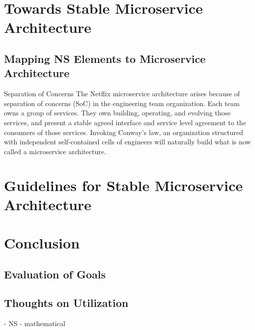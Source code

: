 \documentclass[thesis=M,english,hidelinks]{FITthesis}[2012/10/20]
\begin{document}
% 
% 

\chapter{Towards Stable Microservice Architecture}
\label{sec:msa_compliance}
\section{Mapping NS Elements to Microservice Architecture}


Separation of Concerns
The Netflix microservice architecture arises because of separation of concerns (SoC) in the engineering team organization. Each team owns a group of services. They own building, operating, and evolving those services, and present a stable agreed interface and service level agreement to the consumers of those services. Invoking Conway’s law, an organization structured with independent self-contained cells of engineers will naturally build what is now called a microservice architecture.


\chapter{Guidelines for Stable Microservice Architecture}
\label{sec:guidelines}

% 
% 
\chapter{Conclusion}
\label{sec:conclusion}
\section{Evaluation of Goals}





\section{Thoughts on Utilization}
- NS - mathematical 
\end{document}
